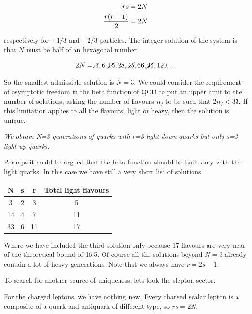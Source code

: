 \documentclass[10pt]{article}
\begin{document}
\begin{eqnarray}
r s = 2 N \\
{r (r+1) \over 2} = 2N  
\end{eqnarray}

respectively for $+1/3$ and $-2/3$ particles. The integer solution of the system is that $N$ must be half
of an hexagonal number %

\begin{equation}
2 N = \cancel { \, 1}, 6, \cancel {15}, 28, \cancel {45}, 66, \cancel {91}, 120, ...
\end{equation}

So the smallest admissible solution is $N=3$. We could
consider the requirement of
asymptotic freedom  in the beta function 
of QCD \cite{Gross:1973id,Gross:1973ju} to put an upper  limit to the number of 
solutions, asking the number of flavours $n_f$ to be such that $2 n_f < 33$.
If this limitation applies to all the flavours,
light or heavy, then the solution is unique.

\emph{We obtain N=3 generations of quarks with r=3 light
down quarks but only s=2 light up quarks.}

Perhaps it could be argued that the beta function 
should be built only with the light quarks. In this case
we have still a very short list of solutions

 
\begin{center}
\begin{tabular}{c|cc|c}
N  & s & r & Total light flavours \\
\hline
3      &     2        &      3      &       5 \\
14      &    4       &       7       &     11 \\
33      &    6      &        11       &    17 
\end{tabular}
\end{center}

Where we have included the third solution only because 17
flavours are very near of the theoretical bound of 16.5. 
Of course all the solutions beyond $N=3$ already contain
a lot of heavy generations. Note that we always have $r = 2 s -1$.

To search for another source of uniqueness, lets look
the slepton sector. 

For the charged leptons, we have nothing new. Every
charged scalar lepton is a composite of a quark and
antiquark of different type, so $ r s = 2 N$. 
\end{document}
